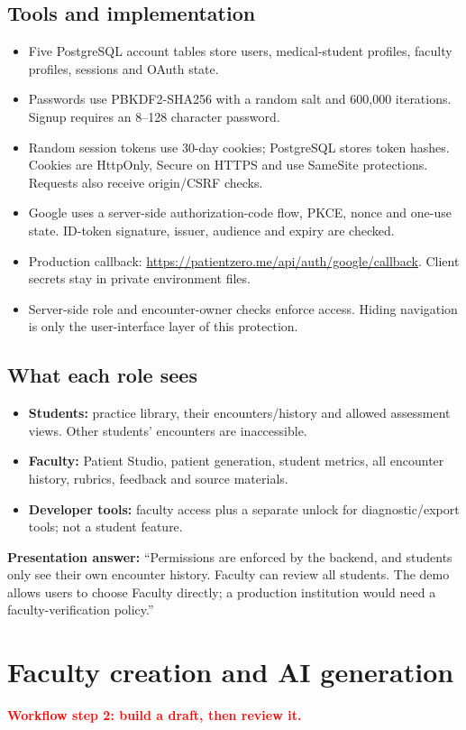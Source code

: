 \documentclass[10pt,letterpaper]{article}
\newcommand{\callout}[1]{\par\vspace{5pt}\noindent\colorbox{pale}{\parbox{\dimexpr\linewidth-2\fboxsep\relax}{\small #1}}\par\vspace{5pt}}
\newcommand{\page}[2]{\clearpage\section{#1}\textcolor{red}{\textbf{#2}}\par}
\begin{document}
\subsection*{Tools and implementation}
\begin{itemize}
\item Five PostgreSQL account tables store users, medical-student profiles, faculty profiles, sessions and OAuth state.
\item Passwords use PBKDF2-SHA256 with a random salt and 600,000 iterations. Signup requires an 8--128 character password.
\item Random session tokens use 30-day cookies; PostgreSQL stores token hashes. Cookies are HttpOnly, Secure on HTTPS and use SameSite protections. Requests also receive origin/CSRF checks.
\item Google uses a server-side authorization-code flow, PKCE, nonce and one-use state. ID-token signature, issuer, audience and expiry are checked.
\item Production callback: \url{https://patientzero.me/api/auth/google/callback}. Client secrets stay in private environment files.
\item Server-side role and encounter-owner checks enforce access. Hiding navigation is only the user-interface layer of this protection.
\end{itemize}
\subsection*{What each role sees}
\begin{itemize}
\item \textbf{Students:} practice library, their encounters/history and allowed assessment views. Other students' encounters are inaccessible.
\item \textbf{Faculty:} Patient Studio, patient generation, student metrics, all encounter history, rubrics, feedback and source materials.
\item \textbf{Developer tools:} faculty access plus a separate unlock for diagnostic/export tools; not a student feature.
\end{itemize}
\callout{\textbf{Presentation answer:} ``Permissions are enforced by the backend, and students only see their own encounter history. Faculty can review all students. The demo allows users to choose Faculty directly; a production institution would need a faculty-verification policy.''}

\page{Faculty creation and AI generation}{Workflow step 2: build a draft, then review it.}
\end{document}
